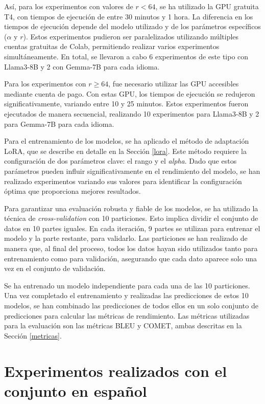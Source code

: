 \documentclass[11pt,spanish,listoffigures,listoftables]{tfgetsinf}
\begin{document}
Así, para los experimentos con valores de $r < 64$, se ha utilizado la GPU gratuita T4, con tiempos de ejecución de entre 30 minutos y 1 hora. La diferencia en los tiempos de ejecución depende del modelo utilizado y de los parámetros específicos ($\alpha$ y $r$). Estos experimentos pudieron ser paralelizados utilizando múltiples cuentas gratuitas de Colab, permitiendo realizar varios experimentos simultáneamente. En total, se llevaron a cabo 6 experimentos de este tipo con Llama3-8B y 2 con Gemma-7B para cada idioma.

Para los experimentos con $r \ge 64$, fue necesario utilizar las GPU accesibles mediante cuenta de pago. Con estas GPU, los tiempos de ejecución se redujeron significativamente, variando entre 10 y 25 minutos. Estos experimentos fueron ejecutados de manera secuencial, realizando 10 experimentos para Llama3-8B y 2 para Gemma-7B para cada idioma.

Para el entrenamiento de los modelos, se ha  aplicado el método de adaptación LoRA, que se describe en detalle en la Sección \ref{lora}. Este método requiere la configuración de dos parámetros clave: el rango y el \textit{alpha}. Dado que estos parámetros pueden influir significativamente en el rendimiento del modelo, se han realizado experimentos variando sus valores para identificar la configuración óptima que proporciona mejores resultados.

Para garantizar una evaluación robusta y fiable de los modelos, se ha utilizado la técnica de \textit{cross-validation} con 10 particiones. Esto implica dividir el conjunto de datos en 10 partes iguales. En cada iteración, 9 partes se utilizan para entrenar el modelo y la parte restante, para validarlo. Las particiones se han realizado de manera que, al final del proceso, todos los datos hayan sido utilizados tanto para entrenamiento como para validación, asegurando que cada dato aparece solo una vez en el conjunto de validación.

Se ha entrenado un modelo independiente para cada una de las 10 particiones. Una vez completado el entrenamiento y realizadas las predicciones de estos 10 modelos, se han combinado las predicciones de todos ellos en un solo conjunto de predicciones para calcular las métricas de rendimiento. Las métricas utilizadas para la evaluación son las métricas BLEU y COMET, ambas descritas en la Sección \ref{metricas}.

\section{Experimentos realizados con el conjunto en español}
\end{document}
